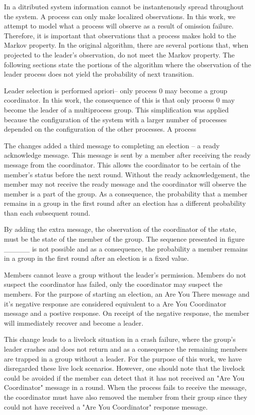 In a ditributed system information cannot be instantenously spread throughout the system.
A process can only make localized observations.
In this work, we attempt to model what a process will observe as a result of omission failure.
Therefore, it is important that observations that a process makes hold to the Markov property.
In the original algorithm, there are several portions that, when projected to the leader's observation, do not meet the Markov property.
The following sections state the portions of the algorithm where the observation of the leader process does not yield the probability of next transition.

Leader selection is performed apriori-- only process 0 may become a group coordinator.
In this work, the consequence of this is that only process 0 may become the leader of a multiprocess group.
This simplification was applied because the configuration of the system with a larger number of processes depended on the configuration of the other processes.
A process

The changes added a third message to completing an election -- a ready acknowledge message.
This message is sent by a member after receiving the ready message from the coordinator.
This allows the coordinator to be certain of the member's status before the next round.
Without the ready acknowledgement, the member may not receive the ready message and the coordinator will observe the member is a part of the group.
As a consequence, the probability that a member remains in a group in the first round after an election has a different probability than each subsequent round.

By adding the extra message, the observation of the coordinator of the state, must be the state of the member of the group.
The sequence presented in figure _____ is not possible and as a consequence, the probability a member remains in a group in the first round after an election is a fixed value.

Members cannot leave a group without the leader's permission.
Members do not suspect the coordinator has failed, only the coordinator may suspect the members.
For the purpose of starting an election, an Are You There message and it's negative response are considered equivalent to a Are You Coordinator message and a postive response.
On receipt of the negative response, the member will immediately recover and become a leader.

This change leads to a livelock situation in a crash failure, where the group's leader crashes and does not return and as a consequence the remaining members are trapped in a group without a leader.
For the purpose of this work, we have disregarded these live lock scenarios.
However, one should note that the livelock could be avoided if the member can detect that it has not received an "Are You Coordinator" message in a round.
When the process fails to receive the message, the coordinator must have also removed the member from their group since they could not have received a "Are You Coordinator" response message.


